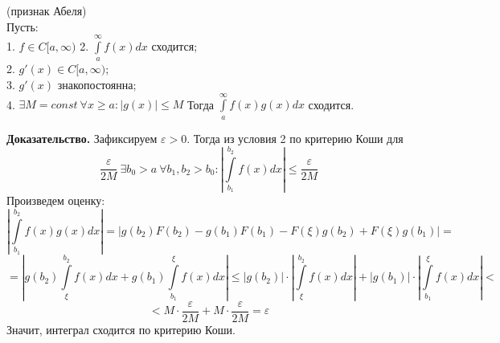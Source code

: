 \begin{theor}
    (признак Абеля)\\
    Пусть:\\
    1. $f\in C[a,\infty)$ 
    2. $\int\limits_{a}^{\infty}f(x)dx$ сходится;\\
    2. $g'(x)\in C[a,\infty)$;\\
    3. $g'(x)$ знакопостоянна;\\
    4. $\exists M=const~\forall x\geqslant a:|g(x)|\leqslant M$
    Тогда $\int\limits_{a}^{\infty}f(x)g(x)dx$ сходится. 
\end{theor}
\textbf{Доказательство.} Зафиксируем $\varepsilon>0$. Тогда из условия 2 по 
критерию Коши для
$$\frac{\varepsilon}{2M}~\exists b_0>a~\forall b_1,b_2>b_0:\left| 
\int\limits_{b_1}^{b_2}f(x)dx\right| \leqslant \frac{\varepsilon}{2M}$$
Произведем оценку:
$$\left| \int\limits_{b_1}^{b_2}f(x)g(x)dx \right| = 
\left| g(b_2)F(b_2) - g(b_1)F(b_1) - F(\xi)g(b_2) +F(\xi)g(b_1) \right| = 
$$
$$ = \left| g(b_2)\int\limits_{\xi}^{b_2}f(x)dx+ g(b_1)\int\limits_{b_1}^{\xi}
f(x)dx \right| \leqslant 
|g(b_2)|\cdot \left|\int\limits_{\xi}^{b_2}f(x)dx\right| + 
|g(b_1)|\cdot \left|\int\limits_{b_1}^{\xi}f(x)dx\right| <
$$
$$ < M\cdot \frac{\varepsilon}{2M} + M\cdot \frac{\varepsilon}{2M} = 
\varepsilon $$
Значит, интеграл сходится по критерию Коши.



